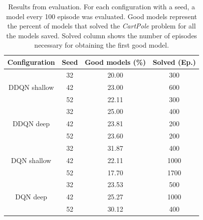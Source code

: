 \begin{table}
	\centering
	\begin{tabular}{|c|c|c|c|}
		\hline
		\textbf{Configuration} & \textbf{Seed} & \textbf{Good models (\%)} & \textbf{Solved (Ep.)} \\
		\hline
			 			& 32 & 20.00 & 300 \\
		DDQN shallow 	& 42 & 23.00 & 600 \\
			 			& 52 & 22.11 & 300 \\
		\hline
		 			& 32 & 25.00 & 400 \\
		DDQN deep  	& 42 & 23.81 & 200 \\
				  	& 52 & 23.60 & 200 \\
		\hline
					& 32 & 31.87 & 400 \\
		DQN	shallow & 42 & 22.11 & 1000 \\
					& 52 & 17.70 & 1700 \\
		\hline
				 & 32 & 23.53 & 500 \\
		DQN deep & 42 & 25.27 & 1000 \\
				 & 52 & 30.12 & 400 \\
		\hline
	\end{tabular}
	\caption{Results from evaluation. For each configuration with a seed, a model every 100 episode was evaluated. Good models represent the percent of models that solved the \textit{CartPole} problem for all the models saved. Solved column shows the number of episodes necessary for obtaining the first good model.}
	\label{tab:comparison_table}
\end{table}
